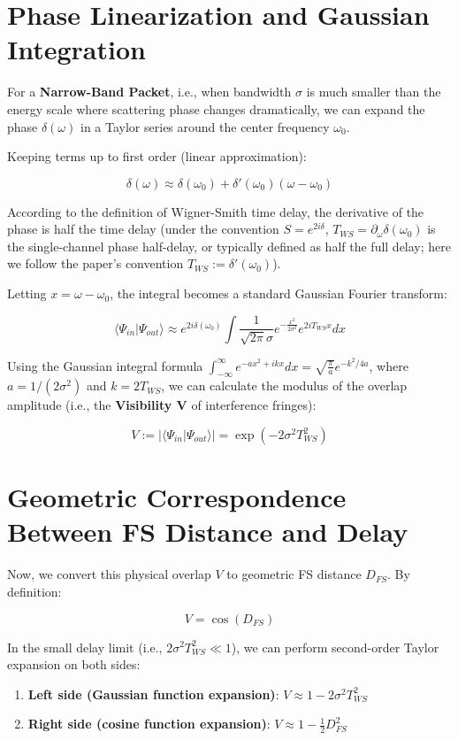 \section{Phase Linearization and Gaussian Integration}

For a \textbf{Narrow-Band Packet}, i.e., when bandwidth $\sigma$ is much smaller than the energy scale where scattering phase changes dramatically, we can expand the phase $\delta(\omega)$ in a Taylor series around the center frequency $\omega_0$.

Keeping terms up to first order (linear approximation):

\[\delta(\omega) \approx \delta(\omega_0) + \delta'(\omega_0)(\omega - \omega_0)\]

According to the definition of Wigner-Smith time delay, the derivative of the phase is half the time delay (under the convention $S=e^{2i\delta}$, $T_{WS} = \partial_\omega \delta(\omega_0)$ is the single-channel phase half-delay, or typically defined as half the full delay; here we follow the paper's convention $T_{WS} := \delta'(\omega_0)$).

Letting $x = \omega - \omega_0$, the integral becomes a standard Gaussian Fourier transform:

\[\langle \Psi_{in} | \Psi_{out} \rangle \approx e^{2i\delta(\omega_0)} \int \frac{1}{\sqrt{2\pi}\sigma} e^{-\frac{x^2}{2\sigma^2}} e^{2iT_{WS}x} dx\]

Using the Gaussian integral formula $\int_{-\infty}^{\infty} e^{-ax^2+ikx} dx = \sqrt{\frac{\pi}{a}} e^{-k^2/4a}$, where $a = 1/(2\sigma^2)$ and $k = 2T_{WS}$, we can calculate the modulus of the overlap amplitude (i.e., the \textbf{Visibility V} of interference fringes):

\[V := |\langle \Psi_{in} | \Psi_{out} \rangle| = \exp\left( -2\sigma^2 T_{WS}^2 \right)\]

\section{Geometric Correspondence Between FS Distance and Delay}

Now, we convert this physical overlap $V$ to geometric FS distance $D_{FS}$. By definition:

\[V = \cos(D_{FS})\]

In the small delay limit (i.e., $2\sigma^2 T_{WS}^2 \ll 1$), we can perform second-order Taylor expansion on both sides:

\begin{enumerate}
\item \textbf{Left side (Gaussian function expansion)}: $V \approx 1 - 2\sigma^2 T_{WS}^2$

\item \textbf{Right side (cosine function expansion)}: $V \approx 1 - \frac{1}{2} D_{FS}^2$
\end{enumerate}

